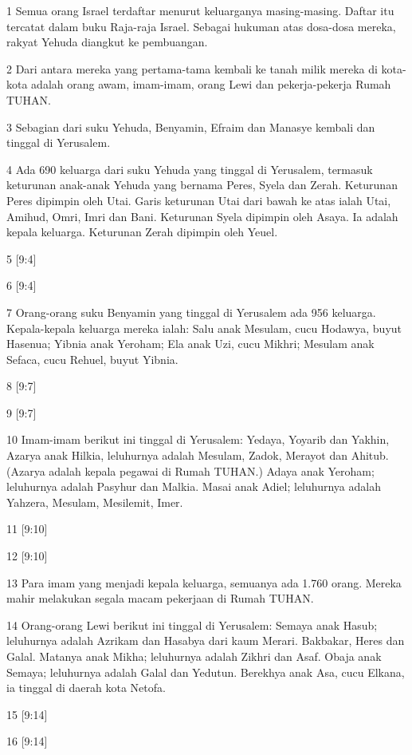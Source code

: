 \par 1 Semua orang Israel terdaftar menurut keluarganya masing-masing. Daftar itu tercatat dalam buku Raja-raja Israel. Sebagai hukuman atas dosa-dosa mereka, rakyat Yehuda diangkut ke pembuangan.
\par 2 Dari antara mereka yang pertama-tama kembali ke tanah milik mereka di kota-kota adalah orang awam, imam-imam, orang Lewi dan pekerja-pekerja Rumah TUHAN.
\par 3 Sebagian dari suku Yehuda, Benyamin, Efraim dan Manasye kembali dan tinggal di Yerusalem.
\par 4 Ada 690 keluarga dari suku Yehuda yang tinggal di Yerusalem, termasuk keturunan anak-anak Yehuda yang bernama Peres, Syela dan Zerah. Keturunan Peres dipimpin oleh Utai. Garis keturunan Utai dari bawah ke atas ialah Utai, Amihud, Omri, Imri dan Bani. Keturunan Syela dipimpin oleh Asaya. Ia adalah kepala keluarga. Keturunan Zerah dipimpin oleh Yeuel.
\par 5 [9:4]
\par 6 [9:4]
\par 7 Orang-orang suku Benyamin yang tinggal di Yerusalem ada 956 keluarga. Kepala-kepala keluarga mereka ialah: Salu anak Mesulam, cucu Hodawya, buyut Hasenua; Yibnia anak Yeroham; Ela anak Uzi, cucu Mikhri; Mesulam anak Sefaca, cucu Rehuel, buyut Yibnia.
\par 8 [9:7]
\par 9 [9:7]
\par 10 Imam-imam berikut ini tinggal di Yerusalem: Yedaya, Yoyarib dan Yakhin, Azarya anak Hilkia, leluhurnya adalah Mesulam, Zadok, Merayot dan Ahitub. (Azarya adalah kepala pegawai di Rumah TUHAN.) Adaya anak Yeroham; leluhurnya adalah Pasyhur dan Malkia. Masai anak Adiel; leluhurnya adalah Yahzera, Mesulam, Mesilemit, Imer.
\par 11 [9:10]
\par 12 [9:10]
\par 13 Para imam yang menjadi kepala keluarga, semuanya ada 1.760 orang. Mereka mahir melakukan segala macam pekerjaan di Rumah TUHAN.
\par 14 Orang-orang Lewi berikut ini tinggal di Yerusalem: Semaya anak Hasub; leluhurnya adalah Azrikam dan Hasabya dari kaum Merari. Bakbakar, Heres dan Galal. Matanya anak Mikha; leluhurnya adalah Zikhri dan Asaf. Obaja anak Semaya; leluhurnya adalah Galal dan Yedutun. Berekhya anak Asa, cucu Elkana, ia tinggal di daerah kota Netofa.
\par 15 [9:14]
\par 16 [9:14]
